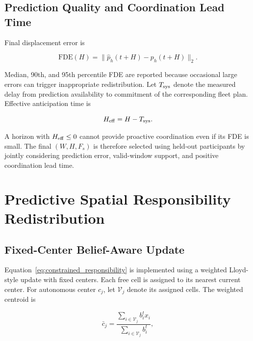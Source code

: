 \documentclass[conference]{IEEEtran}
\begin{document}
\subsection{Prediction Quality and Coordination Lead Time}

Final displacement error is

\begin{equation}
\mathrm{FDE}(H)=
\|\hat p_h(t+H)-p_h(t+H)\|_2.
\label{eq:fde}
\end{equation}

Median, 90th, and 95th percentile FDE are reported because occasional large
errors can trigger inappropriate redistribution. Let $T_{\rm sys}$ denote the
measured delay from prediction availability to commitment of the corresponding
fleet plan. Effective anticipation time is

\begin{equation}
H_{\rm eff}=H-T_{\rm sys}.
\label{eq:heff}
\end{equation}

A horizon with $H_{\rm eff}\le0$ cannot provide proactive coordination even if
its FDE is small. The final $(W,H,F_s)$ is therefore selected using held-out
participants by jointly considering prediction error, valid-window support,
and positive coordination lead time.

\section{Predictive Spatial Responsibility Redistribution}

\subsection{Fixed-Center Belief-Aware Update}

Equation~\eqref{eq:constrained_responsibility} is implemented using a
weighted Lloyd-style update with fixed centers. Each free cell is assigned to
its nearest current center. For autonomous center $c_j$, let $\mathcal{V}_j$
denote its assigned cells. The weighted centroid is

\begin{equation}
\bar c_j=
\frac{\sum_{i\in\mathcal{V}_j}b_i^t x_i}
{\sum_{i\in\mathcal{V}_j}b_i^t},
\label{eq:weighted_centroid}
\end{equation}
\end{document}
